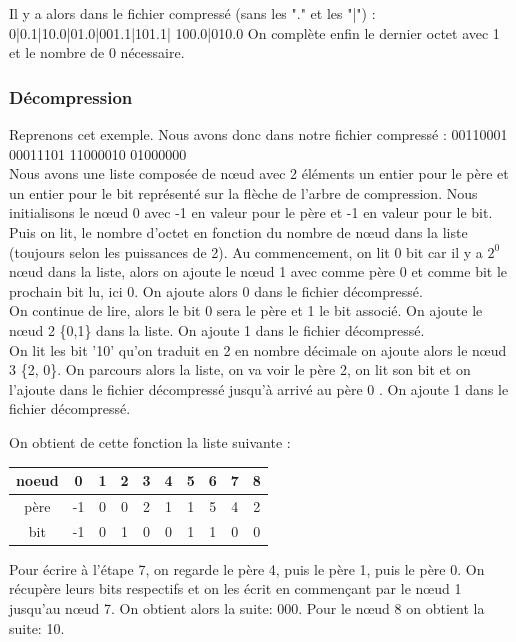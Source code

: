 \documentclass{report}
\begin{document}
Il y a alors dans le fichier compressé (sans les "." et les "|") :\\ 
0|0.1|10.0|01.0|001.1|101.1| 100.0|010.0 
On complète enfin le dernier octet avec 1 et le nombre de 0 nécessaire. 

\subsubsection{Décompression}
Reprenons cet exemple. 
Nous avons donc dans notre fichier compressé :
00110001 00011101 11000010 01000000 \\
Nous avons une liste composée de nœud avec 2 éléments un entier pour le père et un entier pour le bit représenté sur la flèche de l'arbre de compression. Nous initialisons le nœud 0 avec -1 en valeur pour le père et -1 en valeur pour le bit. 
Puis on lit, le nombre d'octet en fonction du nombre de nœud dans la liste (toujours selon les puissances de 2).
Au commencement, on lit 0 bit car il y a $2^{0}$ nœud dans la liste, alors on ajoute le nœud 1 avec comme père 0 et comme bit le prochain bit lu, ici 0.
On ajoute alors 0 dans le fichier décompressé. \\
On continue de lire, alors le bit 0 sera le père et 1 le bit associé. On ajoute le nœud 2 \{0,1\} 
dans la liste. On ajoute 1 dans le fichier décompressé.\\
On lit les bit '10' qu'on traduit en 2 en nombre décimale on ajoute alors le nœud 3 \{2, 0\}. On parcours alors la liste, on va voir le père 2, on lit son bit et on l'ajoute dans le fichier décompressé jusqu'à arrivé au père 0 . On ajoute 1 dans le fichier décompressé. 

On obtient de cette fonction la liste suivante :
\begin{center}
\begin{tabular}{|c|c|c|c|c|c|c|c|c|c|}
\hline
noeud & 0 & 1 & 2 & 3 & 4 & 5 & 6 & 7 & 8 \\
\hline
père & -1 & 0 & 0 & 2 & 1 & 1 & 5 & 4 & 2\\
\hline
bit & -1 & 0 & 1 & 0 & 0 & 1 & 1 & 0 & 0 \\
\hline 
\end{tabular}
\end{center}
 
Pour écrire à l'étape 7, on regarde le père 4, puis le père 1, puis le père 0. 
On récupère leurs bits respectifs et on les écrit en commençant par le nœud  1 jusqu'au nœud 7. On obtient alors la suite: 000.
Pour le nœud 8 on obtient la suite: 10. 
\end{document}

